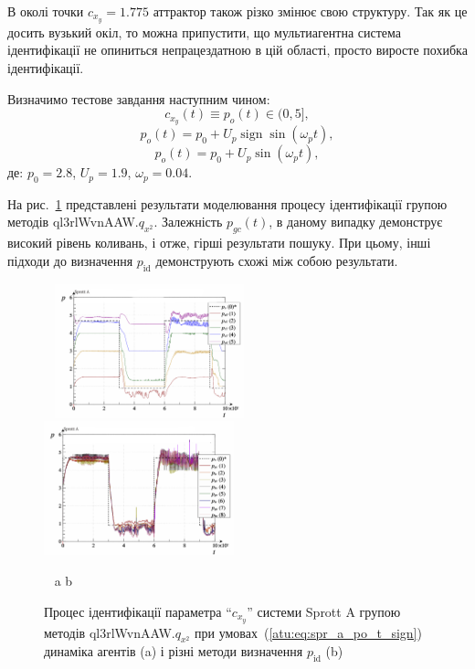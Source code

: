 \documentclass[a4paper,13pt]{atuaref}
\DeclareMathOperator*{\sign}{sign}
\begin{document}
В околі точки $c_{x_y} = 1.775$ аттрактор також різко змінює свою
структуру. Так як це досить вузький окіл, то можна припустити, що
мультиагентна система ідентифікації не опиниться непрацездатною в цій області,
просто виросте похибка ідентифікації.

Визначимо тестове завдання наступним чином:
\[
  c_{x_y}(t) \equiv p_o(t) \in (0, 5],
\]
%
\begin{equation}
  p_o(t) = p_0 +  U_{p} \sign \sin( \omega_{p} t ),
  \label{atu:eq:spr_a_po_t_sign}
\end{equation}
%
%
\begin{equation}
  p_o(t) = p_0 +  U_{p} \sin( \omega_{p} t ),
  \label{atu:eq:spr_a_po_t_sin}
\end{equation}
%
де:
$p_0 = 2.8$, $U_p=1.9$, $\omega_p=0.04$.

На рис.~\ref{atu:f:spr_a_id_ql3rlWvnAAW.q_x2_sign}
представлені результати моделювання процесу ідентифікації групою методів ql3rlWvnAAW.$q_{x^2}$.
Залежність $p_{gc} (t)$, в даному випадку демонструє високий
рівень коливань, і отже, гірші результати пошуку. При цьому, інші підходи до
визначення $p_\mathrm{id}$ демонструють схожі між собою результати.

\begin{figure}[ht!]
  \centerline{
    ~ \hfill
    \includegraphics[width=0.49\textwidth]{p5/p/cha/spr_a/ql3rlWvnAAW_x2/sprott_a_id-p_t_pi_ql3rlWvnAAW_sign_xl.png}
    \hfill
    \includegraphics[width=0.49\textwidth]{p5/p/cha/spr_a/ql3rlWvnAAW_x2/sprott_a_id-p_t_p_ql3rlWvnAAW_sign_xl.png}
    \hfill ~
  }
  \vspace{-1.5ex}
  \begin{center}
    ~ \hfill a \hfill\hfill b \hfill ~
  \end{center}
  \vspace{-2.5ex}
  \caption{Процес ідентифікації параметра ``$c_{x_y}$'' системи Sprott A групою методів ql3rlWvnAAW.$q_{x^2}$ при умовах~(\ref{atu:eq:spr_a_po_t_sign})
  динаміка агентів (a) і різні методи визначення $p_\mathrm{id}$ (b)}
  \label{atu:f:spr_a_id_ql3rlWvnAAW.q_x2_sign}
\end{figure}
\end{document}
